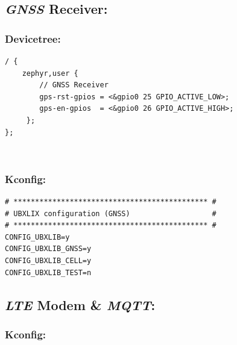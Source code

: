 \documentclass[report.tex]{subfiles}
\begin{document}
\subsection{\textit{GNSS} Receiver:}

\subsubsection{Devicetree:}

\begin{lstlisting}[style=C,label={lst:gnss_def},caption={\textit{DT GNSS} Proprieties Description}]
/ {
	zephyr,user {
		// GNSS Receiver
		gps-rst-gpios = <&gpio0 25 GPIO_ACTIVE_LOW>;
		gps-en-gpios  = <&gpio0 26 GPIO_ACTIVE_HIGH>;
	 };
};
\end{lstlisting}
\;\\[-60pt]
\subsubsection{Kconfig:}

\begin{lstlisting}[style=console,label={lst:gnss_conf},caption={Application \textit{GNSS} Configuration}]
# ********************************************* #
# UBXLIX configuration (GNSS)                   #
# ********************************************* #
CONFIG_UBXLIB=y
CONFIG_UBXLIB_GNSS=y
CONFIG_UBXLIB_CELL=y
CONFIG_UBXLIB_TEST=n
\end{lstlisting}

\subsection{\textit{LTE} Modem \& \textit{MQTT}:}

\subsubsection{Kconfig:}
\end{document}
